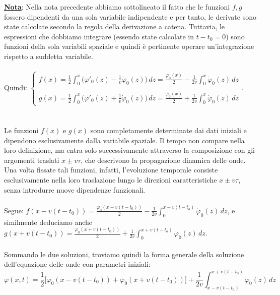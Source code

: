 \documentclass[a4paper,12pt]{report}
\begin{document}
\underline{\textbf{Nota}}: Nella nota precedente abbiamo sottolineato il fatto che le funzioni $f, g$ fossero dipendenti da una sola variabile indipendente e per tanto, le derivate sono state calcolate secondo la regola della derivazione a catena. Tuttavia, le espressioni che dobbiamo integrare (essendo state calcolate in $t-t_0=0$) sono funzioni della sola variabili spaziale e quindi è pertinente operare un'integrazione rispetto a suddetta variabile.
\\
\\ Quindi: $\begin{cases}f(x)=\displaystyle\frac{1}{2}\int_0^x\bigg(\varphi'_0(z)-\frac{1}{v}\dot{\varphi}_0(z)\bigg)\,dz=\frac{\varphi_0(x)}{2}-\frac{1}{2v}\int_0^x\dot{\varphi}_0(z)\,dz
    \\
    \\g(x)=\displaystyle\frac{1}{2}\int_0^x\bigg(\varphi'_0(z)+\frac{1}{v}\dot{\varphi}_0(z)\bigg)\,dz=\frac{\varphi_0(x)}{2}+\frac{1}{2v}\int_0^x\dot{\varphi}_0(z)\,dz
\end{cases}$.
\\
\\
\\Le funzioni $f(x)$ e $g(x)$ sono completamente determinate dai dati iniziali e dipendono esclusivamente dalla variabile spaziale. Il tempo non compare nella loro definizione, ma entra solo successivamente attraverso la composizione con gli argomenti traslati $x\pm v\tau$, che descrivono la propagazione dinamica delle onde. Una volta fissate tali funzioni, infatti, l’evoluzione temporale consiste esclusivamente nella loro traslazione lungo le direzioni caratteristiche $x\pm v\tau$, senza introdurre nuove dipendenze funzionali. 
\\
\\ Segue: $f(x-v(t-t_0))=\displaystyle\frac{\varphi_0(x-v(t-t_0))}{2}-\frac{1}{2v}\int_0^{x-v(t-t_o)}\dot{\varphi}_0(z)\,dz$, e similmente deduciamo anche $g(x+v(t-t_0))=\displaystyle\frac{\varphi_0(x+v(t-t_0))}{2}+\frac{1}{2v}\int_0^{x+v(t-t_o)}\dot{\varphi}_0(z)\,dz$.
\\
\\Sommando le due soluzioni, troviamo quindi la forma generale della soluzione dell'equazione delle onde con parametri iniziali:
\[\varphi(x,t)=\displaystyle\frac{1}{2}\bigg[\varphi_0(x-v(t-t_0))+\varphi_0(x+v(t-t_0))\bigg]+\frac{1}{2v}\int_{x-v(t-t_0)}^{x+v(t-t_0)}\dot{\varphi}_0(z)\,dz\]
\end{document}

